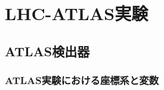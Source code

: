 \chapter{LHC-ATLAS実験}
\label{chap_TGC}





\section{ATLAS検出器}
\label{sec_ATLAS}
    \subsection{ATLAS実験における座標系と変数}


